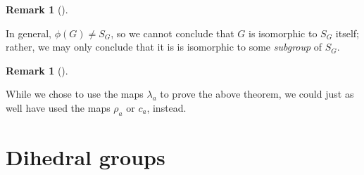 \documentclass[10pt,]{book}
\theoremstyle{plain}
\theoremstyle{definition}
\theoremstyle{definition}
\newtheorem{remark}[theorem]{Remark}
\theoremstyle{definition}
\theoremstyle{definition}
\numberwithin{equation}{section}
\begin{document}
\begin{remark}[]\label{remark-30}

    In general, \(\phi(G) \neq S_G\), so we cannot
    conclude that \(G\) is isomorphic to \(S_G\) itself; rather, we may only
    conclude that it is is isomorphic to some \emph{subgroup} of
    \(S_G\).
\end{remark}
\begin{remark}[]\label{remark-31}

      While we chose to use the maps \(\lambda_a\) to
      prove the above theorem, we could just as well have used the maps
      \(\rho_a\) or \(c_a\), instead.
\end{remark}
\typeout{************************************************}
\typeout{************************************************}
\section[{Dihedral groups}]{Dihedral groups}\label{dihedralgps}
\end{document}
